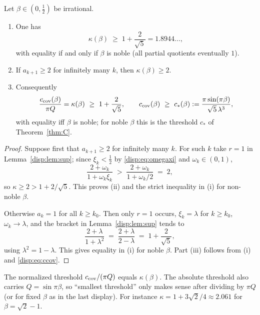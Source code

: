 \begin{proposition}\label{disp:prop:min}
Let $\beta\in(0,\frac12)$ be irrational.
\begin{enumerate}
\item[(i)] One has
\[
\kappa(\beta)\;\ge\;1+\frac2{\sqrt5}=1.8944\ldots ,
\]
with equality if and only if $\beta$ is noble (all partial quotients eventually $1$).
\item[(ii)] If $a_{k+1}\ge2$ for infinitely many $k$, then $\kappa(\beta)\ge2$.
\item[(iii)] Consequently
\[
\frac{c_{\rm cov}(\beta)}{\pi Q}=\kappa(\beta)\ \ge\ 1+\frac2{\sqrt5},\qquad c_{\rm cov}(\beta)\ \ge\ c_*(\beta):=\frac{\pi\sin(\pi\beta)}{\sqrt5\,\lambda^3},
\]
with equality iff $\beta$ is noble; for noble $\beta$ this is the threshold $c_*$ of Theorem~\ref{thm:C}.
\end{enumerate}
\end{proposition}
\begin{proof}
Suppose first that $a_{k+1}\ge2$ for infinitely many $k$. For such $k$ take $r=1$ in Lemma~\ref{disp:lem:sup}; since $\xi_k<\tfrac12$ by
\eqref{disp:eq:omegaxi} and $\omega_k\in(0,1)$,
\[
\frac{2+\omega_k}{1+\omega_k\xi_k}\;>\;\frac{2+\omega_k}{1+\omega_k/2}\;=\;2 ,
\]
so $\kappa\ge2>1+2/\sqrt5$. This proves (ii) and the strict inequality in (i) for non-noble $\beta$.

Otherwise $a_k=1$ for all $k\ge k_0$. Then only $r=1$ occurs, $\xi_k=\lambda$ for $k\ge k_0$, $\omega_k\to\lambda$, and the bracket in
Lemma~\ref{disp:lem:sup} tends to
\[
\frac{2+\lambda}{1+\lambda^2}\;=\;\frac{2+\lambda}{2-\lambda}\;=\;1+\frac2{\sqrt5},
\]
using $\lambda^2=1-\lambda$. This gives equality in (i) for noble $\beta$. Part (iii) follows from (i) and \eqref{disp:eq:ccov}.
\end{proof}

\begin{remark}\label{disp:rem:norm}
The normalized threshold $c_{\rm cov}/(\pi Q)$ equals $\kappa(\beta)$. The absolute threshold also carries $Q=\sin\pi\beta$, so
``smallest threshold'' only makes sense after dividing by $\pi Q$ (or for fixed $\beta$ as in the last display). For instance $\kappa=1+3\sqrt2/4\approx2.061$ for $\beta=\sqrt2-1$.
\end{remark}


